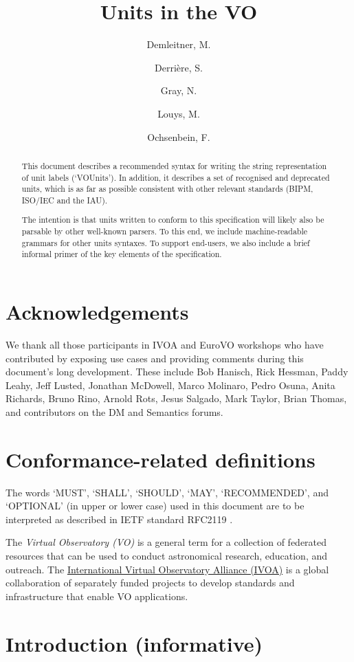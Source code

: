 \documentclass[11pt,a4paper]{ivoa}
\title{Units in the VO}
\author{Demleitner, M.}
\author{Derri\`ere, S.}
\author{Gray, N.}
\author{Louys, M.}
\author{Ochsenbein, F.}
\begin{document}
\begin{abstract}
This document describes a recommended syntax for writing the string
representation of unit labels (`VOUnits').  In addition, it describes
a set of recognised and deprecated units, which is as far as possible
consistent with other relevant standards (BIPM, ISO/IEC and the IAU).

The intention is that units written to conform to this specification
will likely also be parsable by other well-known parsers.  To this
end, we include machine-readable grammars for other units syntaxes.
To support end-users, we also include a brief informal primer of the key
elements of the specification.
\end{abstract}



\section*{Acknowledgements}

We thank all those participants in IVOA and EuroVO workshops who have
contributed by exposing use cases and providing comments during this
document's long development.  These include
Bob Hanisch,
Rick Hessman,
Paddy Leahy,
Jeff Lusted,
Jonathan McDowell,
Marco Molinaro,
Pedro Osuna,
Anita Richards,
Bruno Rino,
Arnold Rots,
Jesus Salgado,
Mark Taylor,
Brian Thomas,
and contributors on the DM and Semantics forums.

\section*{Conformance-related definitions}

The words `MUST', `SHALL', `SHOULD', `MAY', `RECOMMENDED', and
`OPTIONAL' (in upper or lower case) used in this document are to be
interpreted as described in IETF standard RFC2119 \citep{std:RFC2119}.

The \emph{Virtual Observatory (VO)} is a
general term for a collection of federated resources that can be used
to conduct astronomical research, education, and outreach.
The \href{https://www.ivoa.net}{International
Virtual Observatory Alliance (IVOA)} is a global
collaboration of separately funded projects to develop standards and
infrastructure that enable VO applications.


\section{Introduction (informative)}
\label{sec:intro}
\end{document}
